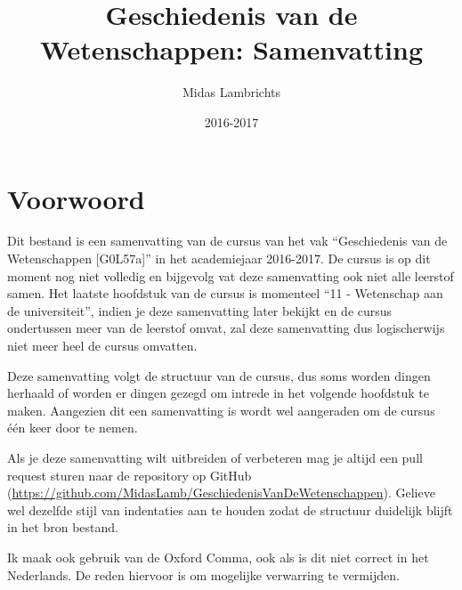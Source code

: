 \documentclass{article}
\title{Geschiedenis van de Wetenschappen: Samenvatting}
\author{Midas Lambrichts}
\date{2016-2017}
\begin{document}
  \maketitle
  \tableofcontents
  \newpage

  \section*{Voorwoord}
  Dit bestand is een samenvatting van de cursus van het vak ``Geschiedenis van de Wetenschappen [G0L57a]'' in het academiejaar 2016-2017. De cursus is op dit moment nog niet volledig en bijgevolg vat deze samenvatting ook niet alle leerstof samen. Het laatste hoofdstuk van de cursus is momenteel ``11 - Wetenschap aan de universiteit'', indien je deze samenvatting later bekijkt en de cursus ondertussen meer van de leerstof omvat, zal deze samenvatting dus logischerwijs niet meer heel de cursus omvatten.

  Deze samenvatting volgt de structuur van de cursus, dus soms worden dingen herhaald of worden er dingen gezegd om intrede in het volgende hoofdstuk te maken. Aangezien dit een samenvatting is wordt wel aangeraden om de cursus \'e\'en keer door te nemen.

  Als je deze samenvatting wilt uitbreiden of verbeteren mag je altijd een pull request sturen naar de repository op GitHub (\url{https://github.com/MidasLamb/GeschiedenisVanDeWetenschappen}). Gelieve wel dezelfde stijl van indentaties aan te houden zodat de structuur duidelijk blijft in het bron bestand.
  
  Ik maak ook gebruik van de Oxford Comma, ook als is dit niet correct in het Nederlands. De reden hiervoor is om mogelijke verwarring te vermijden.

  \newpage
\end{document}
